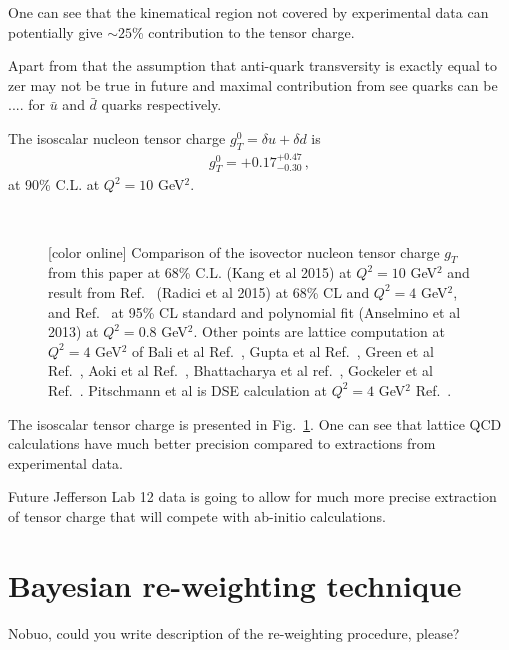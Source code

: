 \documentclass[twocolumn,showpacs,preprintnumbers,amsmath,amssymb,floatfix,prd]{revtex4}
\newcommand*{\FigPath}{.}%
\def\AP#1{{\color{blue} #1}}
\begin{document}
One can see that the kinematical region not covered by experimental data can potentially give $\sim 25$\% contribution to the tensor charge.

Apart from that the assumption that anti-quark transversity is exactly equal to zer may not be true in future and maximal contribution from see quarks can be ....
for $\bar u$ and $\bar d$ quarks respectively.


The isoscalar nucleon tensor charge $g_T^0= \delta u + \delta d$ is
\begin{eqnarray}
g_T^0 = +0.17^{+0.47}_{-0.30} \, ,
\end{eqnarray}
at 90\% C.L. at  $Q^2=10$ GeV$^2$.



\begin{figure}[tbp]
\centering
 \\
\caption{[color online] Comparison of the isovector nucleon tensor charge $g_T$   from this paper at 68\% C.L. (Kang et al 2015) at $Q^2=10$ GeV$^2$ and result from Ref.~\cite{Radici:2015mwa}  (Radici et al 2015) at 68\% CL and  $Q^2=4$ GeV$^2$,
and Ref.~\cite{Anselmino:2013vqa} at 95\% CL standard and polynomial fit (Anselmino et al 2013) at $Q^2=0.8$ GeV$^2$. Other points are lattice computation  at $Q^2=4$ GeV$^2$ of Bali et al Ref.~\cite{Bali:2014nma},  Gupta et al Ref.~\cite{Gupta:2015tpa}, Green et al Ref.~\cite{Green:2012ej}, Aoki et al Ref.~\cite{Aoki:2010xg}, Bhattacharya et al  ref.~\cite{Bhattacharya:2013ehc}, Gockeler et al Ref.~\cite{Gockeler:2005cj}. Pitschmann et al is DSE calculation at $Q^2=4$ GeV$^2$  Ref.~\cite{Pitschmann:2014jxa}.}
\label{fig:comparison_gt}
\end{figure}
  
The isoscalar tensor charge is presented in Fig.~\ref{fig:comparison_gt}. 
One can see that lattice QCD calculations have much better precision compared to extractions from experimental data.

Future Jefferson Lab 12 data is going to allow for much more precise extraction of tensor charge that will compete with ab-initio calculations.

\section{Bayesian re-weighting technique}
%
\AP{Nobuo, could you write description of the re-weighting procedure, please?}
\end{document}
